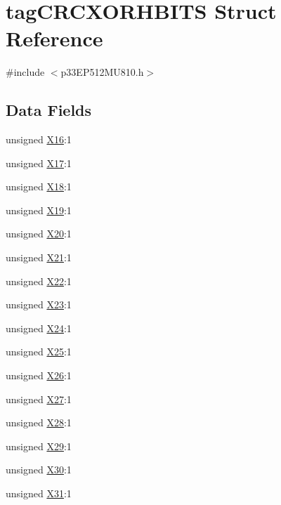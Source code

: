 \hypertarget{structtag_c_r_c_x_o_r_h_b_i_t_s}{}\section{tag\+C\+R\+C\+X\+O\+R\+H\+B\+I\+TS Struct Reference}
\label{structtag_c_r_c_x_o_r_h_b_i_t_s}


{\ttfamily \#include $<$p33\+E\+P512\+M\+U810.\+h$>$}

\subsection*{Data Fields}
\begin{DoxyCompactItemize}
\item 
unsigned \hyperlink{structtag_c_r_c_x_o_r_h_b_i_t_s_a5d24b31f1d7710d7cc218af891766cea}{X16}\+:1
\item 
unsigned \hyperlink{structtag_c_r_c_x_o_r_h_b_i_t_s_ab5c66a7ae393e43038b747f298402548}{X17}\+:1
\item 
unsigned \hyperlink{structtag_c_r_c_x_o_r_h_b_i_t_s_a8a718dc07120c14e96e0c0eba3121ec6}{X18}\+:1
\item 
unsigned \hyperlink{structtag_c_r_c_x_o_r_h_b_i_t_s_ad80a979836980593096bf1b1172f41dd}{X19}\+:1
\item 
unsigned \hyperlink{structtag_c_r_c_x_o_r_h_b_i_t_s_a652558b9a5a18b2f1df3faaf322ab509}{X20}\+:1
\item 
unsigned \hyperlink{structtag_c_r_c_x_o_r_h_b_i_t_s_a49b288b7dbaac1a49f72a762973ccf5a}{X21}\+:1
\item 
unsigned \hyperlink{structtag_c_r_c_x_o_r_h_b_i_t_s_a77324e1ad1f9bf3c87a3831c2662cca0}{X22}\+:1
\item 
unsigned \hyperlink{structtag_c_r_c_x_o_r_h_b_i_t_s_a221cdacfb60e702c7e5bf7395c584426}{X23}\+:1
\item 
unsigned \hyperlink{structtag_c_r_c_x_o_r_h_b_i_t_s_a457e12fae147219e83cb1564ece4abc0}{X24}\+:1
\item 
unsigned \hyperlink{structtag_c_r_c_x_o_r_h_b_i_t_s_a48b2eeedf1ca93e402ff63c240f3c7d1}{X25}\+:1
\item 
unsigned \hyperlink{structtag_c_r_c_x_o_r_h_b_i_t_s_a0750d8c7af44bf805c0303affaebf2a2}{X26}\+:1
\item 
unsigned \hyperlink{structtag_c_r_c_x_o_r_h_b_i_t_s_ac478d5a333022450ab269dc7214652aa}{X27}\+:1
\item 
unsigned \hyperlink{structtag_c_r_c_x_o_r_h_b_i_t_s_a7870476992e5e2067067fc0be6954b53}{X28}\+:1
\item 
unsigned \hyperlink{structtag_c_r_c_x_o_r_h_b_i_t_s_ab083e9ac9e3d68ece2a7648da71037ff}{X29}\+:1
\item 
unsigned \hyperlink{structtag_c_r_c_x_o_r_h_b_i_t_s_a74cf3409511eae45282fd11004523974}{X30}\+:1
\item 
unsigned \hyperlink{structtag_c_r_c_x_o_r_h_b_i_t_s_ab1dedfa9b394f7fa0afee647b393effe}{X31}\+:1
\end{DoxyCompactItemize}


